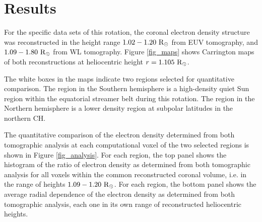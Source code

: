 \documentclass[baaa]{baaa}
\begin{document}
\section{Results}

For the specific data sets of this rotation, the coronal electron density structure was reconstructed in the height range $1.02-1.20~\rm{R}_\odot$ from EUV tomography, and $1.09-1.80~\rm{R}_\odot$ from WL tomography. Figure \ref{fig_maps} shows Carrington maps of both reconstructions at heliocentric height $r=1.105~\rm{R}_\odot$. 

The white boxes in the maps indicate two regions selected for quantitative comparison. The region in the Southern hemisphere is a high-density quiet Sun region within the equatorial streamer belt during this rotation. The region in the Northern hemisphere is a lower density region at subpolar latitudes in the northern CH.

The quantitative comparison of the electron density determined from both tomographic analysis at each computational voxel of the two selected regions is shown in Figure \ref{fig_analysis}. For each region, the top panel shows the histogram of the ratio of electron density as determined from both tomographic analysis for all voxels within the common reconstructed coronal volume, i.e. in the range of heights $1.09-1.20~\rm{R}_\odot$.
For each region, the bottom panel shows the average radial dependence of the electron density as determined from both tomographic analysis, each one in its own range of reconstructed heliocentric heights.
\end{document}
